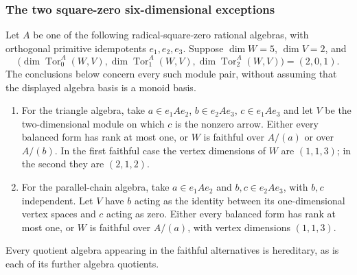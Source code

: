\subsubsection{The two square-zero six-dimensional exceptions}

\begin{lemma}\label{B:six-squarezero-target-modules}
Let $A$ be one of the following radical-square-zero rational
algebras, with orthogonal primitive idempotents $e_1,e_2,e_3$.
Suppose $\dim W=5$, $\dim V=2$, and
\[
 \bigl(\dim\operatorname{Tor}_0^A(W,V),
       \dim\operatorname{Tor}_1^A(W,V),
       \dim\operatorname{Tor}_2^A(W,V)\bigr)=(2,0,1).
\]
The conclusions below concern every such module pair, without
assuming that the displayed algebra basis is a monoid basis.
\begin{enumerate}
\item For the triangle algebra, take
$a\in e_1Ae_2$, $b\in e_2Ae_3$, $c\in e_1Ae_3$ and let $V$
be the two-dimensional module on which $c$ is the nonzero arrow.
Either every balanced form has rank at most one, or $W$ is
faithful over $A/(a)$ or over $A/(b)$.  In the first faithful
case the vertex dimensions of $W$ are $(1,1,3)$; in the second
they are $(2,1,2)$.
\item For the parallel-chain algebra, take
$a\in e_1Ae_2$ and $b,c\in e_2Ae_3$, with $b,c$ independent.
Let $V$ have $b$ acting as the identity between its one-dimensional
vertex spaces and $c$ acting as zero.  Either every balanced form
has rank at most one, or $W$ is faithful over $A/(a)$, with vertex
dimensions $(1,1,3)$.
\end{enumerate}
Every quotient algebra appearing in the faithful alternatives is
hereditary, as is each of its further algebra quotients.
\end{lemma}
